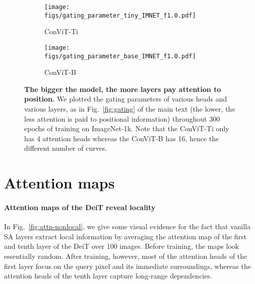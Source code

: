 \documentclass[a4paper,11pt,twocolumn]{article}
\begin{document}
\begin{figure}[h]
    \begin{subfigure}[b]{\linewidth}
    \centering
    \texttt{[image: figs/gating\_parameter\_tiny\_IMNET\_f1.0.pdf]}
    \caption{ConViT-Ti}
    \end{subfigure}
    \begin{subfigure}[b]{\linewidth}
    \centering
    \texttt{[image: figs/gating\_parameter\_base\_IMNET\_f1.0.pdf]}
    \caption{ConViT-B}
    \end{subfigure}
    \caption{\textbf{The bigger the model, the more layers pay attention to position.} We plotted the gating parameters of various heads and various layers, as in Fig.~\ref{fig:gating} of the main text (the lower, the less attention is paid to positional information) throughout 300 epochs of training on ImageNet-1k. Note that the ConViT-Ti only has 4 attention heads whereas the ConViT-B has 16, hence the different number of curves.}
    \label{fig:gating-sizes}
\end{figure}







\clearpage

\section{Attention maps}
\label{app:attention-maps}

\paragraph{Attention maps of the DeiT reveal locality}

In Fig.~\ref{fig:attn-nonlocal}, we give some visual evidence for the fact that vanilla SA layers extract local information by averaging the attention map of the first and tenth layer of the DeiT over 100 images. Before training, the maps look essentially random. After training, however, most of the attention heads of the first layer focus on the query pixel and its immediate surroundings, whereas the attention heads of the tenth layer capture long-range dependencies.
\end{document}
